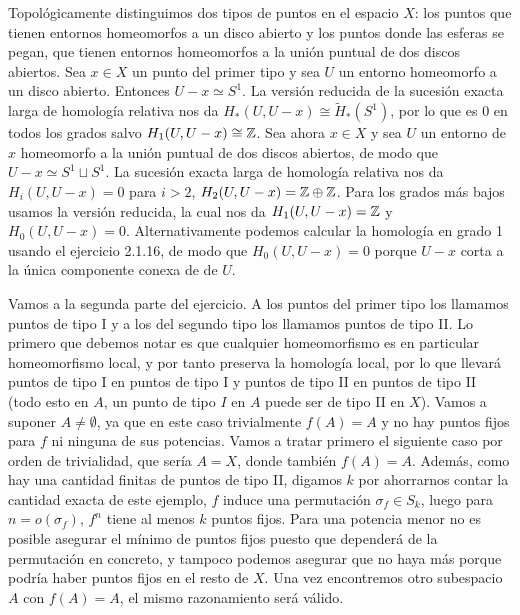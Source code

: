 \documentclass[twoside]{article}
\begin{document}
\begin{solucion}
Topológicamente distinguimos dos tipos de puntos en el espacio $X$: los puntos que tienen entornos homeomorfos a un disco abierto y los puntos donde las esferas se pegan, que tienen entornos homeomorfos a la unión puntual de dos discos abiertos. Sea $x\in X$ un punto del primer tipo y sea $U$ un entorno homeomorfo a un disco abierto. Entonces $U-x\simeq S^1$. La versión reducida de la sucesión exacta larga de homología relativa nos da $H_*(U,U-x)\cong \widetilde{H}_*(S^1)$, por lo que es 0 en todos los grados salvo $H_1(U,U-x)\cong\mathbb{Z}$. Sea ahora $x\in X$ y sea $U$ un entorno de $x$ homeomorfo a la unión puntual de dos discos abiertos, de modo que $U-x\simeq S^1\sqcup S^1$. La sucesión exacta larga de homología relativa nos da $H_i(U,U-x)=0$ para $i>2$, $H_2(U,U-x)=\mathbb{Z}\oplus\mathbb{Z}$. Para los grados más bajos usamos la versión reducida, la cual nos da $H_1(U,U-x)=\mathbb{Z}$ y $H_0(U,U-x)=0$. Alternativamente podemos calcular la homología en grado 1 usando el ejercicio 2.1.16, de modo que $H_0(U,U-x)=0$ porque $U-x$ corta a la única componente conexa de de $U$. 

\vspace{0.5cm}

Vamos a la segunda parte del ejercicio. A los puntos del primer tipo los llamamos puntos de tipo I y a los del segundo tipo los llamamos puntos de tipo II. Lo primero que debemos notar es que cualquier homeomorfismo es en particular homeomorfismo local, y por tanto preserva la homología local, por lo que llevará puntos de tipo I en puntos de tipo I y puntos de tipo II en puntos de tipo II (todo esto en $A$, un punto de tipo $I$ en $A$ puede ser de tipo II en $X$). Vamos a suponer $A\neq\emptyset$, ya que en este caso trivialmente $f(A)=A$ y no hay puntos fijos para $f$ ni ninguna de sus potencias. Vamos a tratar primero el siguiente caso por orden de trivialidad, que sería $A=X$, donde también $f(A)=A$. Además, como hay una cantidad finitas de puntos de tipo II, digamos $k$ por ahorrarnos contar la cantidad exacta de este ejemplo, $f$ induce una permutación $\sigma_f\in S_k$, luego para $n=o(\sigma_f)$, $f^n$ tiene al menos $k$ puntos fijos. Para una potencia menor no es posible asegurar el mínimo de puntos fijos puesto que dependerá de la permutación en concreto, y tampoco podemos asegurar que no haya más porque podría haber puntos fijos en el resto de $X$. Una vez encontremos otro subespacio $A$ con $f(A)=A$, el mismo razonamiento será válido.


\end{solucion}
\end{document}
